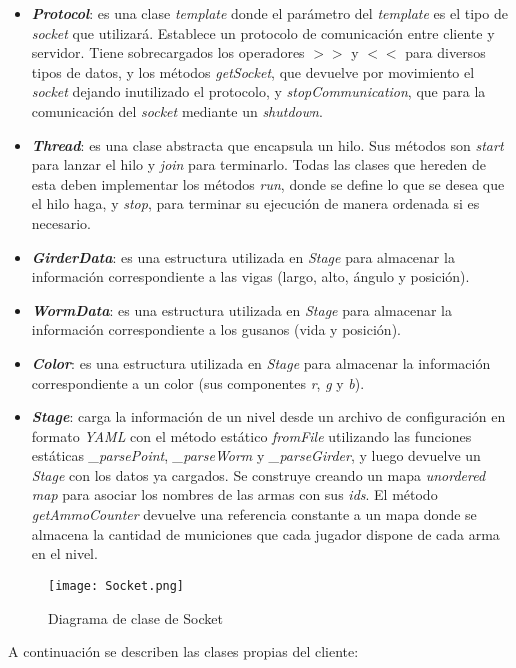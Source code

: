\begin{itemize}
	\item \textbf{\textit{Protocol}}: es una clase \textit{template} donde el parámetro del \textit{template} es el tipo de \textit{socket} que utilizará. Establece un protocolo de comunicación entre cliente y servidor. Tiene sobrecargados los operadores $>>$ y $<<$ para diversos tipos de datos, y los métodos \textit{getSocket}, que devuelve por movimiento el \textit{socket} dejando inutilizado el protocolo, y \textit{stopCommunication}, que para la comunicación del \textit{socket} mediante un \textit{shutdown}.

	\item \textbf{\textit{Thread}}: es una clase abstracta que encapsula un hilo. Sus métodos son \textit{start} para lanzar el hilo y \textit{join} para terminarlo. Todas las clases que hereden de esta deben implementar los métodos \textit{run}, donde se define lo que se desea que el hilo haga, y \textit{stop}, para terminar su ejecución de manera ordenada si es necesario.

	\item \textbf{\textit{GirderData}}: es una estructura utilizada en \textit{Stage} para almacenar la información correspondiente a las vigas (largo, alto, ángulo y posición).

	\item \textbf{\textit{WormData}}: es una estructura utilizada en \textit{Stage} para almacenar la información correspondiente a los gusanos (vida y posición).

	\item \textbf{\textit{Color}}: es una estructura utilizada en \textit{Stage} para almacenar la información correspondiente a un color (sus componentes \textit{r}, \textit{g} y \textit{b}).

	\item \textbf{\textit{Stage}}: carga la información de un nivel desde un archivo de configuración en formato \textit{YAML} con el método estático \textit{fromFile} utilizando las funciones estáticas \textit{\_parsePoint}, \textit{\_parseWorm} y \textit{\_parseGirder}, y luego devuelve un \textit{Stage} con los datos ya cargados. Se construye creando un mapa \textit{unordered map} para asociar los nombres de las armas con sus \textit{ids}. El método \textit{getAmmoCounter} devuelve una referencia constante a un mapa donde se almacena la cantidad de municiones que cada jugador dispone de cada arma en el nivel.
\end{itemize}

\begin{figure}[H]
	\texttt{[image: Socket.png]}
	\caption{Diagrama de clase de Socket}
	\label{im:socket}
\end{figure}
A continuación se describen las clases propias del cliente:

